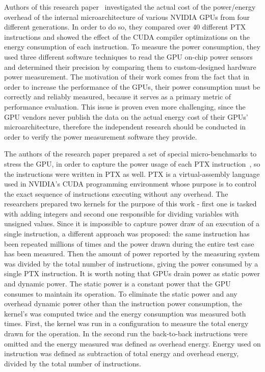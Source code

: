 Authors of this research paper~\cite{State_of_the_Art_Article_2}
investigated the actual cost of the power/energy overhead of
the internal microarchitecture of various NVIDIA GPUs from
four different generations. In order to do so, they compared
over 40 different PTX instructions and showed the effect of
the CUDA compiler optimizations on the energy consumption of
each instruction. To measure the power consumption, they used
three different software techniques to read the GPU on-chip
power sensors and determined their precision by comparing them
to custom-designed hardware power measurement.
The motivation of their work comes from the fact that in order
to increase the performance of the GPUs, their power consumption
must be correctly and reliably measured, because it serves as
a primary metric of performance evaluation. This issue is proven
even more challenging, since the GPU vendors never publish the
data on the actual energy cost of their GPUs' microarchitecture,
therefore the independent research should be conducted in order
to verify the power measurement software they provide.

The authors of the research paper prepared a set of special
micro-benchmarks to stress the GPU, in order to capture the
power usage of each PTX
instruction~\cite{NVIDIA_Parallel_Thread_Execution}, so the
instructions were written in PTX as well. PTX is a virtual-assembly
language used in NVIDIA's CUDA programming environment whose purpose
is to control the exact sequence of instructions executing without
any overhead. The researchers prepared two kernels for the purpose
of this work - first one is tasked with adding integers and second
one responsible for dividing variables with unsigned values.
Since it is impossible to capture power draw of an execution of
a single instruction, a different approach was proposed: the same
instruction has been repeated millions of times and the power
drawn during the entire test case has been measured. Then the
amount of power reported by the measuring system was divided by
the total number of instructions, giving the power consumed by
a single PTX instruction. It is worth noting that GPUs drain
power as static power and dynamic power. The static power is
a constant power that the GPU consumes to maintain its operation.
To eliminate the static power and any overhead dynamic power
other than the instruction power consumption, the kernel's was
computed twice and the energy consumption was measured both times.
First, the kernel was run in a configuration to measure the total
energy drawn for the operation. In the second run the back-to-back
instructions were omitted and the energy measured was defined as
overhead energy. Energy used on instruction was defined as
subtraction of total energy and overhead energy, divided by the
total number of instructions.

